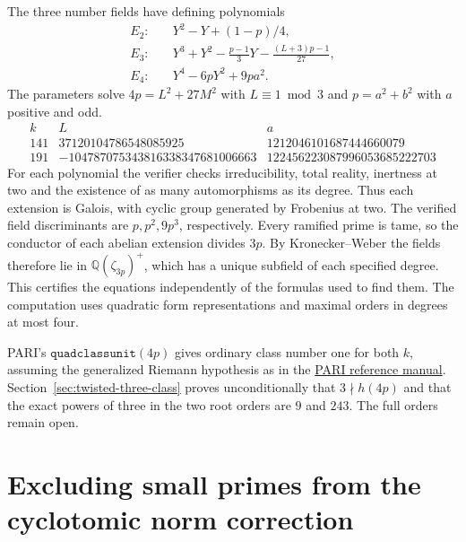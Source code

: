 \documentclass[11pt]{article}
\begin{document}
The three number fields have defining polynomials
\[
\begin{aligned}
 E_2:\quad &Y^2-Y+(1-p)/4,\\
 E_3:\quad &Y^3+Y^2-\frac{p-1}{3}Y-\frac{(L+3)p-1}{27},\\
 E_4:\quad &Y^4-6pY^2+9pa^2.
\end{aligned}
\]
The parameters solve \(4p=L^2+27M^2\) with \(L\equiv1\bmod3\)
and \(p=a^2+b^2\) with \(a\) positive and odd.
\[
\begin{array}{r|r|r}
 k&L&a\\\hline
 141&37120104786548085925&1212046101687444660079\\
 191&-104787075343816338347681006663&122456223087996053685222703
\end{array}
\]
For each polynomial the verifier checks irreducibility, total
reality, inertness at two and the existence of as many automorphisms
as its degree. Thus each extension is Galois, with cyclic group
generated by Frobenius at two. The verified field discriminants
are \(p,p^2,9p^3\), respectively. Every ramified prime is tame,
so the conductor of each abelian extension divides \(3p\).
By Kronecker--Weber the fields therefore lie in
\(\mathbb Q(\zeta_{3p})^+\), which has a unique subfield of each
specified degree. This certifies the equations independently of
the formulas used to find them. The computation uses quadratic
form representations and maximal orders in degrees at most four.

PARI's \(\texttt{quadclassunit}(4p)\) gives ordinary class number
one for both \(k\), assuming the generalized Riemann hypothesis
as in the
\href{https://pari.math.u-bordeaux.fr/dochtml/html-stable/Arithmetic_functions.html\#quadclassunit}
{PARI reference manual}. Section~\ref{sec:twisted-three-class} proves
unconditionally that \(3\nmid h(4p)\) and that the exact powers of
three in the two root orders are \(9\) and \(243\). The full orders
remain open.

\clearpage
\section{Excluding small primes from the cyclotomic norm correction}
\label{sec:twisted-correction-lattice}
\end{document}
